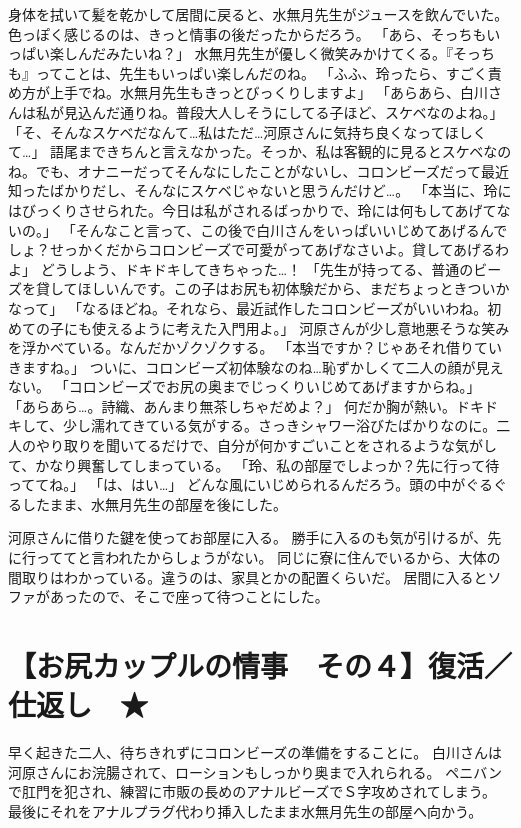 身体を拭いて髪を乾かして居間に戻ると、水無月先生がジュースを飲んでいた。色っぽく感じるのは、きっと情事の後だったからだろう。
「あら、そっちもいっぱい楽しんだみたいね？」
水無月先生が優しく微笑みかけてくる。『そっちも』ってことは、先生もいっぱい楽しんだのね。
「ふふ、玲ったら、すごく責め方が上手でね。水無月先生もきっとびっくりしますよ」
「あらあら、白川さんは私が見込んだ通りね。普段大人しそうにしてる子ほど、スケベなのよね。」
「そ、そんなスケベだなんて…私はただ…河原さんに気持ち良くなってほしくて…」
語尾まできちんと言えなかった。そっか、私は客観的に見るとスケベなのね。でも、オナニーだってそんなにしたことがないし、コロンビーズだって最近知ったばかりだし、そんなにスケベじゃないと思うんだけど…。
「本当に、玲にはびっくりさせられた。今日は私がされるばっかりで、玲には何もしてあげてないの。」
「そんなこと言って、この後で白川さんをいっぱいいじめてあげるんでしょ？せっかくだからコロンビーズで可愛がってあげなさいよ。貸してあげるわよ」
どうしよう、ドキドキしてきちゃった…！
「先生が持ってる、普通のビーズを貸してほしいんです。この子はお尻も初体験だから、まだちょっときついかなって」
「なるほどね。それなら、最近試作したコロンビーズがいいわね。初めての子にも使えるように考えた入門用よ。」
河原さんが少し意地悪そうな笑みを浮かべている。なんだかゾクゾクする。
「本当ですか？じゃあそれ借りていきますね。」
ついに、コロンビーズ初体験なのね…恥ずかしくて二人の顔が見えない。
「コロンビーズでお尻の奥までじっくりいじめてあげますからね。」
「あらあら…。詩織、あんまり無茶しちゃだめよ？」
何だか胸が熱い。ドキドキして、少し濡れてきている気がする。さっきシャワー浴びたばかりなのに。二人のやり取りを聞いてるだけで、自分が何かすごいことをされるような気がして、かなり興奮してしまっている。
「玲、私の部屋でしよっか？先に行って待っててね。」
「は、はい…」
どんな風にいじめられるんだろう。頭の中がぐるぐるしたまま、水無月先生の部屋を後にした。

河原さんに借りた鍵を使ってお部屋に入る。
勝手に入るのも気が引けるが、先に行っててと言われたからしょうがない。
同じに寮に住んでいるから、大体の間取りはわかっている。違うのは、家具とかの配置くらいだ。
居間に入るとソファがあったので、そこで座って待つことにした。






\section{【お尻カップルの情事　その４】復活／仕返し　★}
早く起きた二人、待ちきれずにコロンビーズの準備をすることに。
白川さんは河原さんにお浣腸されて、ローションもしっかり奥まで入れられる。
ペニバンで肛門を犯され、練習に市販の長めのアナルビーズでＳ字攻めされてしまう。
最後にそれをアナルプラグ代わり挿入したまま水無月先生の部屋へ向かう。



